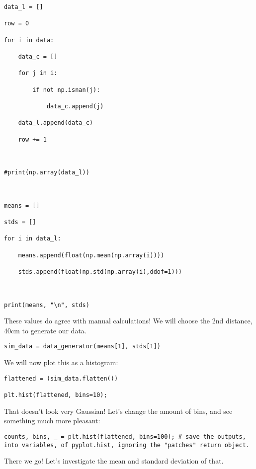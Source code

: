 \documentclass[12pt]{article}
\begin{document}
\begin{lstlisting}[frame=shadowbox]
data_l = []

row = 0

for i in data:

    data_c = []

    for j in i:

        if not np.isnan(j):

            data_c.append(j)

    data_l.append(data_c)

    row += 1



#print(np.array(data_l))



means = []

stds = []

for i in data_l:

    means.append(float(np.mean(np.array(i))))

    stds.append(float(np.std(np.array(i),ddof=1)))



print(means, "\n", stds)
\end{lstlisting}


These values do agree with manual calculations! We will choose the 2nd distance, 40cm to generate our data.


\begin{lstlisting}[frame=shadowbox]
sim_data = data_generator(means[1], stds[1])
\end{lstlisting}


We will now plot this as a histogram:


\begin{lstlisting}[frame=shadowbox]
flattened = (sim_data.flatten())

plt.hist(flattened, bins=10);
\end{lstlisting}


That doesn't look very Gaussian! Let's change the amount of bins, and see something much more pleasant:


\begin{lstlisting}[frame=shadowbox]
counts, bins, _ = plt.hist(flattened, bins=100); # save the outputs, into variables, of pyplot.hist, ignoring the "patches" return object.
\end{lstlisting}


There we go! Let's investigate the mean and standard deviation of that.
\end{document}
